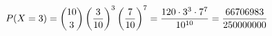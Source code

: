 \documentclass[preview]{standalone}
\begin{document}
\begin{align*}
\special{dvisvgm:raw <g id='unique000'>}P(X=3)=\binom{10}{3}\left(\frac3{10}\right)^3\left(\frac7{10}\right)^7=\frac{120\cdot3^3\cdot7^7}{10^{10}}=\frac{66706983}{250000000}\special{dvisvgm:raw </g>}
\end{align*}
\end{document}
